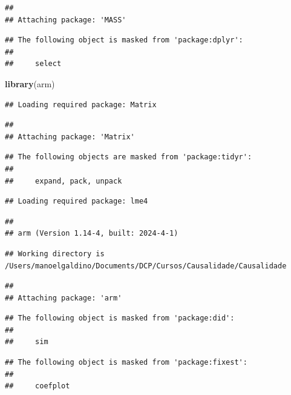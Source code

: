 \documentclass[
]{article}
\newenvironment{Shaded}{\begin{snugshade}}{\end{snugshade}}
\newcommand{\FunctionTok}[1]{\textcolor[rgb]{0.13,0.29,0.53}{\textbf{#1}}}
\newcommand{\NormalTok}[1]{#1}
\begin{document}
\begin{verbatim}
## 
## Attaching package: 'MASS'
\end{verbatim}

\begin{verbatim}
## The following object is masked from 'package:dplyr':
## 
##     select
\end{verbatim}

\begin{Shaded}
\begin{Highlighting}[]
\FunctionTok{library}\NormalTok{(arm)}
\end{Highlighting}
\end{Shaded}

\begin{verbatim}
## Loading required package: Matrix
\end{verbatim}

\begin{verbatim}
## 
## Attaching package: 'Matrix'
\end{verbatim}

\begin{verbatim}
## The following objects are masked from 'package:tidyr':
## 
##     expand, pack, unpack
\end{verbatim}

\begin{verbatim}
## Loading required package: lme4
\end{verbatim}

\begin{verbatim}
## 
## arm (Version 1.14-4, built: 2024-4-1)
\end{verbatim}

\begin{verbatim}
## Working directory is /Users/manoelgaldino/Documents/DCP/Cursos/Causalidade/Causalidade
\end{verbatim}

\begin{verbatim}
## 
## Attaching package: 'arm'
\end{verbatim}

\begin{verbatim}
## The following object is masked from 'package:did':
## 
##     sim
\end{verbatim}

\begin{verbatim}
## The following object is masked from 'package:fixest':
## 
##     coefplot
\end{verbatim}
\end{document}
